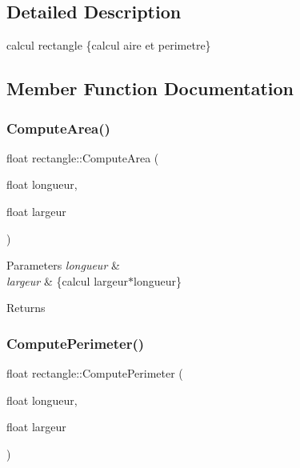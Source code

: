 \subsection{Detailed Description}
calcul rectangle \{calcul aire et perimetre\} 

\subsection{Member Function Documentation}
\mbox{\label{classrectangle_a7dafa66d6ad61db0ba37c2b75ee50e4c}} 
\subsubsection{\texorpdfstring{Compute\+Area()}{ComputeArea()}}
{\footnotesize\ttfamily float rectangle\+::\+Compute\+Area (\begin{DoxyParamCaption}\item[{float}]{longueur,  }\item[{float}]{largeur }\end{DoxyParamCaption})\hspace{0.3cm}{\ttfamily [override]}}


\begin{DoxyParams}{Parameters}
{\em longueur} & \\
\hline
{\em largeur} & \{calcul largeur$\ast$longueur\} \\
\hline
\end{DoxyParams}
\begin{DoxyReturn}{Returns}

\end{DoxyReturn}
\mbox{\label{classrectangle_ad9eb8dfdd783c528dd7a6011e0d89dcb}} 
\subsubsection{\texorpdfstring{Compute\+Perimeter()}{ComputePerimeter()}}
{\footnotesize\ttfamily float rectangle\+::\+Compute\+Perimeter (\begin{DoxyParamCaption}\item[{float}]{longueur,  }\item[{float}]{largeur }\end{DoxyParamCaption})\hspace{0.3cm}{\ttfamily [override]}}


